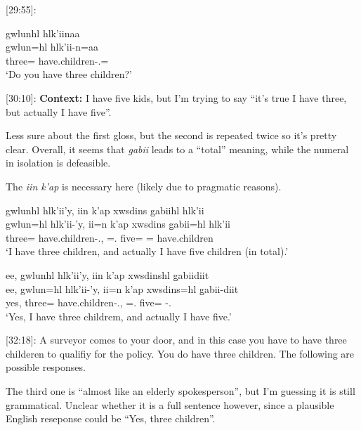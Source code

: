 [29:55]:

\begin{exe}
    \ex \glll gwlunhl hlk'iinaa \\
    gwlun=hl hlk'ii-n=aa \\
    three=\Cn{} have.children-\Ssg{}.\Ii{}=\Q{} \\
    `Do you have three children?'
\end{exe}

[30:10]: \textbf{Context:} I have five kids, but I'm trying to say ``it's true I have three, but actually I have five''.

Less sure about the first gloss, but the second is repeated twice so it's pretty clear. Overall, it seems that \textit{g̱abii} leads to a ``total'' meaning, while the numeral in isolation is defeasible.

The \textit{iin k'ap} is necessary here (likely due to pragmatic reasons).

\begin{exe}
    \ex
    \begin{xlist}
        \item \glll gwlunhl hlk'ii'y, iin k'ap xwsdins g̱abiihl hlk'ii  \\
    gwlun=hl hlk'ii-'y, ii=n k'ap xwsdins g̱abii=hl hlk'ii  \\
    three=\Cn{} have.children-\Fsg{}.\Ii{}, \Ccnj{}=\Fsg{}.\I{} \Verum{} five=\Cn{} \Cnt{}=\Cn{} have.children \\
    `I have three children, and actually I have five children (in total).'

    \item \glll ee, gwlunhl hlk'ii'y, iin k'ap xwsdinshl g̱abiidiit \\
    ee, gwlun=hl hlk'ii-'y, ii=n k'ap xwsdins=hl g̱abii-diit\\
    yes, three=\Cn{} have.children-\Fsg{}.\Ii{}, \Ccnj{}=\Fsg{}.\I{} \Verum{} five=\Cn{} \Cnt{}-\Tpl{}.\Ii{} \\
    `Yes, I have three childrem, and actually I have five.'
    \end{xlist}
\end{exe}

[32:18]: A surveyor comes to your door, and in this case you have to have three childeren to qualifiy for the policy. You do have three children. The following are possible responses.

The third one is ``almost like an elderly spokesperson'', but I'm guessing it is still grammatical. Unclear whether it is a full sentence however, since a plausible English reseponse could be ``Yes, three children''.

